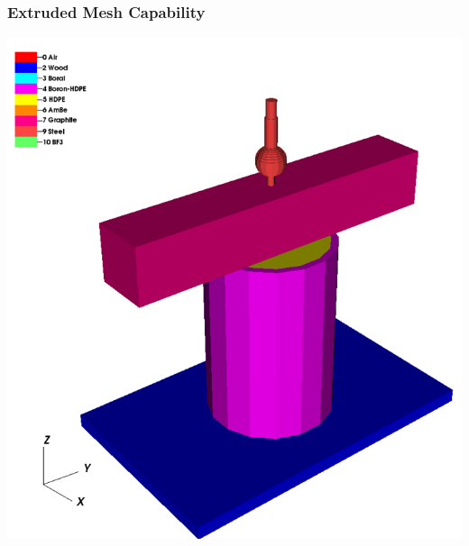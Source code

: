 \documentclass[]{beamer}
\begin{document}
\begin{frame}[t]\frametitle{Extruded Mesh Capability}
\centering
\includegraphics[scale=0.25]{figures/IM1_3D_extrude.png}
\end{frame}
\end{document}
